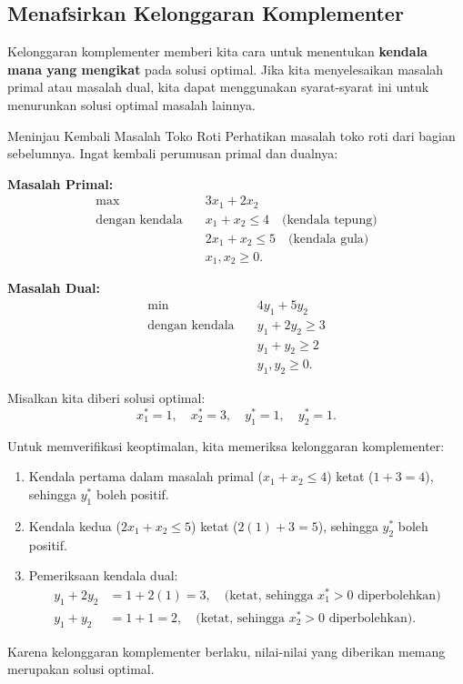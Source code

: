 \subsection{Menafsirkan Kelonggaran Komplementer}
Kelonggaran komplementer memberi kita cara untuk menentukan \textbf{kendala mana yang mengikat} pada solusi optimal. Jika kita menyelesaikan masalah primal atau masalah dual, kita dapat menggunakan syarat-syarat ini untuk menurunkan solusi optimal masalah lainnya.

\begin{example}{Meninjau Kembali Masalah Toko Roti}\label{example:cs-bakery-revisited}
Perhatikan masalah toko roti dari bagian sebelumnya. Ingat kembali perumusan primal dan dualnya:

\textbf{Masalah Primal:}
\begin{align*}
\max \quad & 3x_1 + 2x_2 \\
\text{dengan kendala} \quad & x_1 + x_2 \leq 4 \quad \text{(kendala tepung)} \\
& 2x_1 + x_2 \leq 5 \quad \text{(kendala gula)} \\
& x_1, x_2 \geq 0.
\end{align*}

\textbf{Masalah Dual:}
\begin{align*}
\min \quad & 4y_1 + 5y_2 \\
\text{dengan kendala} \quad & y_1 + 2y_2 \geq 3 \\
& y_1 + y_2 \geq 2 \\
& y_1, y_2 \geq 0.
\end{align*}

Misalkan kita diberi solusi optimal:
\[
x_1^* = 1, \quad x_2^* = 3, \quad y_1^* = 1, \quad y_2^* = 1.
\]

Untuk memverifikasi keoptimalan, kita memeriksa kelonggaran komplementer:
\begin{enumerate}
\item Kendala pertama dalam masalah primal ($x_1 + x_2 \leq 4$) ketat ($1+3=4$), sehingga $y_1^*$ boleh positif.
\item Kendala kedua ($2x_1 + x_2 \leq 5$) ketat ($2(1) + 3 = 5$), sehingga $y_2^*$ boleh positif.
\item Pemeriksaan kendala dual:
   \begin{align*}
   y_1 + 2y_2 &= 1 + 2(1) = 3, \quad \text{(ketat, sehingga $x_1^* > 0$ diperbolehkan)} \\
   y_1 + y_2 &= 1 + 1 = 2, \quad \text{(ketat, sehingga $x_2^* > 0$ diperbolehkan)}.
   \end{align*}
\end{enumerate}
Karena kelonggaran komplementer berlaku, nilai-nilai yang diberikan memang merupakan solusi optimal.
\end{example}

